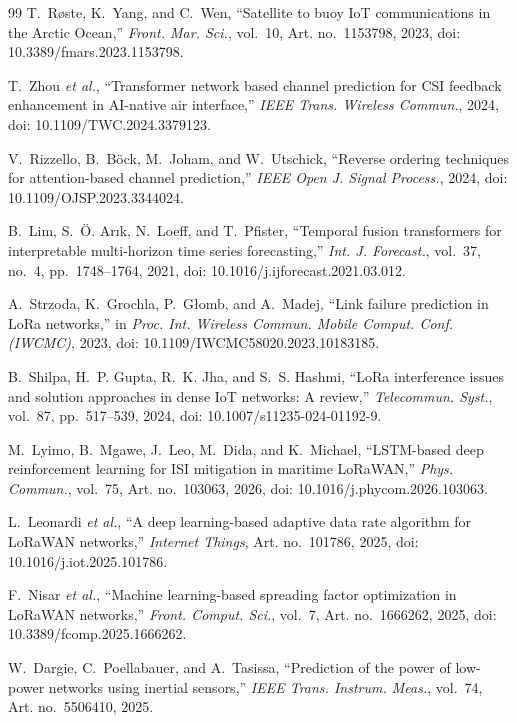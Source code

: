 \begin{thebibliography}{99}
 T.~R{\o}ste, K.~Yang, and C.~Wen, ``Satellite to buoy IoT communications in the Arctic Ocean,'' \emph{Front. Mar. Sci.}, vol.~10, Art. no.~1153798, 2023, doi: 10.3389/fmars.2023.1153798.

 T.~Zhou \emph{et al.}, ``Transformer network based channel prediction for CSI feedback enhancement in AI-native air interface,'' \emph{IEEE Trans. Wireless Commun.}, 2024, doi: 10.1109/TWC.2024.3379123.

 V.~Rizzello, B.~B\"ock, M.~Joham, and W.~Utschick, ``Reverse ordering techniques for attention-based channel prediction,'' \emph{IEEE Open J. Signal Process.}, 2024, doi: 10.1109/OJSP.2023.3344024.

 B.~Lim, S.~\"O. Ar{\i}k, N.~Loeff, and T.~Pfister, ``Temporal fusion transformers for interpretable multi-horizon time series forecasting,'' \emph{Int. J. Forecast.}, vol.~37, no.~4, pp.~1748--1764, 2021, doi: 10.1016/j.ijforecast.2021.03.012.

 A.~Strzoda, K.~Grochla, P.~G{\l}omb, and A.~Madej, ``Link failure prediction in LoRa networks,'' in \emph{Proc. Int. Wireless Commun. Mobile Comput. Conf. (IWCMC)}, 2023, doi: 10.1109/IWCMC58020.2023.10183185.

 B.~Shilpa, H.~P. Gupta, R.~K. Jha, and S.~S. Hashmi, ``LoRa interference issues and solution approaches in dense IoT networks: A review,'' \emph{Telecommun. Syst.}, vol.~87, pp.~517--539, 2024, doi: 10.1007/s11235-024-01192-9.

 M.~Lyimo, B.~Mgawe, J.~Leo, M.~Dida, and K.~Michael, ``LSTM-based deep reinforcement learning for ISI mitigation in maritime LoRaWAN,'' \emph{Phys. Commun.}, vol.~75, Art. no.~103063, 2026, doi: 10.1016/j.phycom.2026.103063.

 L.~Leonardi \emph{et al.}, ``A deep learning-based adaptive data rate algorithm for LoRaWAN networks,'' \emph{Internet Things}, Art. no.~101786, 2025, doi: 10.1016/j.iot.2025.101786.

 F.~Nisar \emph{et al.}, ``Machine learning-based spreading factor optimization in LoRaWAN networks,'' \emph{Front. Comput. Sci.}, vol.~7, Art. no.~1666262, 2025, doi: 10.3389/fcomp.2025.1666262.

 W.~Dargie, C.~Poellabauer, and A.~Tasissa, ``Prediction of the power of low-power networks using inertial sensors,'' \emph{IEEE Trans. Instrum. Meas.}, vol.~74, Art. no.~5506410, 2025.


\end{thebibliography}
